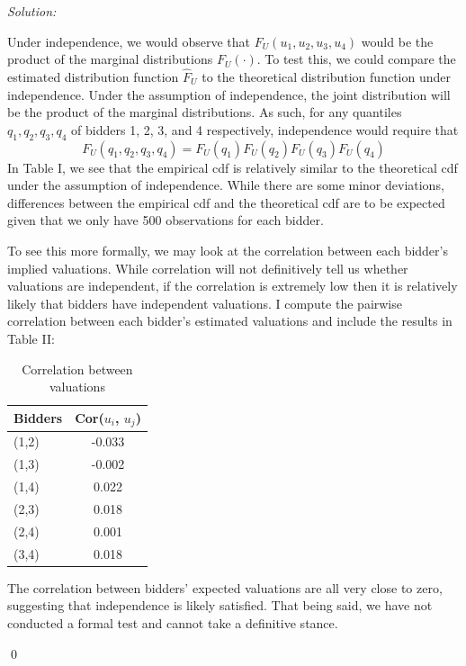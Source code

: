 \documentclass[12pt]{article}
\newenvironment{sol}
    {\emph{Solution:}
    }
    {
    \qed
    }
\begin{document}
\begin{sol}
Under independence, we would observe that $F_U(u_1, u_2, u_3, u_4)$ would be the product of the marginal distributions $F_U(\cdot)$. To test this, we could compare the estimated distribution function $\hat{F}_U$ to the theoretical distribution function under independence. Under the assumption of independence, the joint distribution will be the product of the marginal distributions. As such, for any quantiles $q_1, q_2, q_3, q_4$ of bidders 1, 2, 3, and 4 respectively, independence would require that \[F_U(q_1, q_2, q_3, q_4) = F_U(q_1) F_U(q_2) F_U(q_3) F_U(q_4)\]
In Table I, we see that the empirical cdf is relatively similar to the theoretical cdf under the assumption of independence. While there are some minor deviations, differences between the empirical cdf and the theoretical cdf are to be expected given that we only have 500 observations for each bidder. 

To see this more formally, we may look at the correlation between each bidder's implied valuations. While correlation will not definitively tell us whether valuations are independent, if the correlation is extremely low then it is relatively likely that bidders have independent valuations. I compute the pairwise correlation between each bidder's estimated valuations and include the results in Table II:
\begin{center}
    \begin{table}[!htbp]
        \centering
        \caption{Correlation between valuations}
          \begin{tabular}{lc}
              \toprule
                Bidders               & Cor($u_i$, $u_j$)             \\
              \midrule
                (1,2) & -0.033\\
                (1,3) & -0.002\\
                (1,4)& 0.022\\
                (2,3) & 0.018\\
                (2,4) & 0.001\\
                (3,4) & 0.018\\
              \bottomrule
          \end{tabular}
        \label{tab:Value_cor}
      \end{table}
\end{center} 
The correlation between bidders' expected valuations are all very close to zero, suggesting that independence is likely satisfied. That being said, we have not conducted a formal test and cannot take a definitive stance. 
\end{sol}
\end{document}
